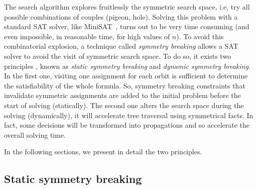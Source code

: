 The search algorithm explores
fruitlessly the symmetric search space, i.e, try all possible combinations of couples (pigeon, hole).
Solving this problem with a standard SAT solver, like MiniSAT~\cite{een2003extensible},
 turns out to be very time consuming (and even impossible, in reasonable time, for high values of $n$). 
To avoid this combinatorial explosion, a technique called \emph{symmetry breaking} allows a SAT solver to avoid the visit of symmetric search space. To do so, it exists two principles , known as \emph{static symmetry breaking}
and \emph{dynamic symmetry breaking}. In the first one, visiting one assignment for each orbit is sufficient to determine the satisfiability of the whole formula. So, symmetry breaking constraints that invalidate symmetric 
assignments are added to the initial problem before the start of solving (statically). The second one alters
the search space during the solving (dynamically), it will accelerate tree traversal using symmetrical facts.
In fact, some decisions will be transformed into propagations and so accelerate the overall solving time.
  
In the following sections, we present in detail the two principles.


\subsection{Static symmetry breaking}




